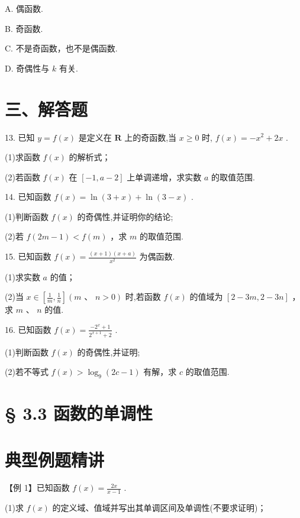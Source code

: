 A. 偶函数.

B. 奇函数.

C. 不是奇函数，也不是偶函数.

D. 奇偶性与 $k$ 有关.

\section*{三、解答题}

13. 已知 $y = f\left( x\right)$ 是定义在 $\mathbf{R}$ 上的奇函数,当 $x \geq  0$ 时, $f\left( x\right)  =  - {x}^{2} + {2x}$ .

(1)求函数 $f\left( x\right)$ 的解析式；

(2)若函数 $f\left( x\right)$ 在 $\left\lbrack  {-1,a - 2}\right\rbrack$ 上单调递增，求实数 $a$ 的取值范围.

14. 已知函数 $f\left( x\right)  = \ln \left( {3 + x}\right)  + \ln \left( {3 - x}\right)$ .

(1)判断函数 $f\left( x\right)$ 的奇偶性,并证明你的结论;

(2)若 $f\left( {{2m} - 1}\right)  < f\left( m\right)$ ，求 $m$ 的取值范围.

15. 已知函数 $f\left( x\right)  = \frac{\left( {x + 1}\right) \left( {x + a}\right) }{{x}^{2}}$ 为偶函数.

(1)求实数 $a$ 的值；

(2)当 $x \in  \left\lbrack  {\frac{1}{m},\frac{1}{n}}\right\rbrack  \left( {m\text{ 、 }n > 0}\right)$ 时,若函数 $f\left( x\right)$ 的值域为 $\left\lbrack  {2 - {3m},2 - {3n}}\right\rbrack$ ，求 $m\text{ 、 }n$ 的值.

16. 已知函数 $f\left( x\right)  = \frac{-{2}^{x} + 1}{{2}^{x + 1} + 2}$ .

(1)判断函数 $f\left( x\right)$ 的奇偶性,并证明;

(2)若不等式 $f\left( x\right)  > {\log }_{9}\left( {{2c} - 1}\right)$ 有解，求 $c$ 的取值范围.

\section*{§ 3.3 函数的单调性}

\section*{典型例题精讲}

【例 1】已知函数 $f\left( x\right)  = \frac{2x}{x - 1}$ .

(1)求 $f\left( x\right)$ 的定义域、值域并写出其单调区间及单调性(不要求证明)；

